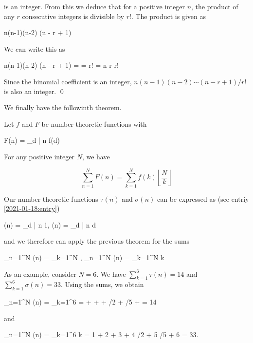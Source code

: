 is an integer. From this we deduce that for a positive integer $n$, the product of any $r$ consecutive integers is divisible by $r!$. The product is given as

\bee
n(n-1)(n-2) \cdots (n - r + 1)
\eee

We can write this as

\bee
n(n-1)(n-2) \cdots (n - r + 1) =  = r! = {n \choose r} r!
\eee

Since the binomial coefficient is an integer, $n(n-1)(n-2) \cdots (n - r + 1) / r!$ is also an integer. \qed

We finally have the followinth theorem.

\begin{theorem}
    Let $f$ and $F$ be number-theoretic functions with

    \bee
        F(n) = \sum_{d | n} f(d)
    \eee

    For any positive integer $N$, we have

    \begin{equation}
        \sum_{n=1}^N F(n) = \sum_{k=1}^N f(k) \left\lfloor \frac{N}{k} \right\rfloor
    \end{equation}

\end{theorem}

Our number theoretic functions $\tau(n)$ and $\sigma(n)$ can be expressed as (see entriy \ref{2021-01-18:entry})

\bee
\tau(n) = \sum_{d | n} 1, \qquad \sigma(n) = \sum_{d | n} d
\eee

and we therefore can apply the previous theorem for the sums

\bee
\sum_{n=1}^N \tau(n) = \sum_{k=1}^N \left\lfloor {} \right\rfloor, \qquad \sum_{n=1}^N \sigma(n) = \sum_{k=1}^N k \left\lfloor {} \right\rfloor
\eee

As an example, consider $N = 6$. We have $\sum_{k=1}^6 \tau(n) = 14$ and $\sum_{k=1}^6 \sigma(n) = 33$. Using the sums, we obtain

\bee
\sum_{n=1}^N \tau(n) = \sum_{k=1}^6 \left\lfloor {} \right\rfloor =  \rfloor +  \rfloor +  \rfloor + /2 \rfloor + /5 \rfloor +  \rfloor = 14
\eee

and

\bee
\sum_{n=1}^N \sigma(n) = \sum_{k=1}^6 k \left\lfloor {} \right\rfloor = 1  \rfloor + 2  \rfloor + 3  \rfloor + 4 /2 \rfloor + 5 /5 \rfloor + 6  \rfloor = 33.
\eee



